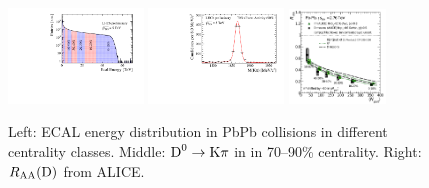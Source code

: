 \documentclass[a4paper,11pt]{article}
\begin{document}
\begin{figure}[htb]
  \begin{center}
    \includegraphics[width=0.32\textwidth]{plots/ecal_in_ecal_bins.pdf}
    \hspace{0.02\textwidth}
    \includegraphics[width=0.32\textwidth]{plots/d0_ecalbin_90_70.pdf}
    \hspace{0.02\textwidth}
    \includegraphics[width=0.23\textwidth]{plots/ALICE_D0.pdf}
  \end{center}
  \vspace{-20pt}
  \caption{Left: ECAL energy distribution in 
PbPb collisions in different centrality classes.
  Middle: $\text{D}^0 \to \text{K}\pi$ in \pbpb in 70--90\% centrality. Right: $R_{\text{AA}}(\text{D})$ from ALICE.
  \label{fig:pbpblhcb}}
\end{figure}
\end{document}
